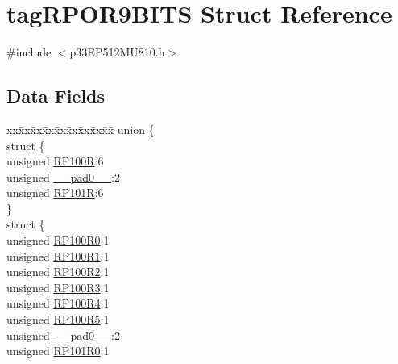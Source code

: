 \hypertarget{structtag_r_p_o_r9_b_i_t_s}{}\section{tag\+R\+P\+O\+R9\+B\+I\+TS Struct Reference}
\label{structtag_r_p_o_r9_b_i_t_s}


{\ttfamily \#include $<$p33\+E\+P512\+M\+U810.\+h$>$}

\subsection*{Data Fields}
\begin{DoxyCompactItemize}
\item 
\begin{tabbing}
xx\=xx\=xx\=xx\=xx\=xx\=xx\=xx\=xx\=\kill
union \{\\
\>struct \{\\
\>\>unsigned \hyperlink{structtag_r_p_o_r9_b_i_t_s_a2bbdb0365f1dd6bb5d5a118aa38637e7}{RP100R}:6\\
\>\>unsigned \hyperlink{structtag_r_p_o_r9_b_i_t_s_adf71f3d8410c1f1dbbc96680a92c49af}{\_\_pad0\_\_}:2\\
\>\>unsigned \hyperlink{structtag_r_p_o_r9_b_i_t_s_abdae28a81176725ca1be07657b6f9ef1}{RP101R}:6\\
\>\} \\
\>struct \{\\
\>\>unsigned \hyperlink{structtag_r_p_o_r9_b_i_t_s_a6f957cc4d03376828bc8b8de401827bc}{RP100R0}:1\\
\>\>unsigned \hyperlink{structtag_r_p_o_r9_b_i_t_s_a21f3fbb9aa3947b0eb025ce6da992ebc}{RP100R1}:1\\
\>\>unsigned \hyperlink{structtag_r_p_o_r9_b_i_t_s_aa23b0425cb1b9ae5915c0535b9d8297f}{RP100R2}:1\\
\>\>unsigned \hyperlink{structtag_r_p_o_r9_b_i_t_s_ab8ec0177e1c12c9f1e140bf596b7ffa0}{RP100R3}:1\\
\>\>unsigned \hyperlink{structtag_r_p_o_r9_b_i_t_s_aadedfc3eead1175d0dc70432866a8f9d}{RP100R4}:1\\
\>\>unsigned \hyperlink{structtag_r_p_o_r9_b_i_t_s_a76ae8071d94f173d543df8ebaed66014}{RP100R5}:1\\
\>\>unsigned \hyperlink{structtag_r_p_o_r9_b_i_t_s_adf71f3d8410c1f1dbbc96680a92c49af}{\_\_pad0\_\_}:2\\
\>\>unsigned \hyperlink{structtag_r_p_o_r9_b_i_t_s_a17e44e4006cafd86a0175ccc5933c4e5}{RP101R0}:1\\

\end{tabbing}
\end{DoxyCompactItemize}
